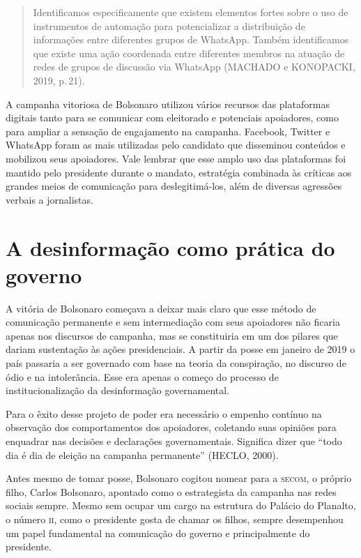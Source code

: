 \begin{quote}
Identificamos especificamente que existem elementos fortes sobre o uso
de instrumentos de automação para potencializar a distribuição de
informações entre diferentes grupos de WhatsApp. Também identificamos
que existe uma ação coordenada entre diferentes membros na atuação de
redes de grupos de discussão via WhatsApp (MACHADO e KONOPACKI, 2019, p.\,21).
\end{quote}

A campanha vitoriosa de Bolsonaro utilizou vários recursos das
plataformas digitais tanto para se comunicar com eleitorado e potenciais
apoiadores, como para ampliar a sensação de engajamento na campanha.
Facebook, Twitter e WhatsApp foram as mais utilizadas pelo candidato que
disseminou conteúdos e mobilizou seus apoiadores. Vale lembrar que esse
amplo uso das plataformas foi mantido pelo presidente durante o mandato,
estratégia combinada às críticas aos grandes meios de comunicação para
deslegitimá-los, além de diversas agressões verbais a jornalistas.

\section{A desinformação como prática do governo }

A vitória de Bolsonaro começava a deixar mais claro que esse método de
comunicação permanente e sem intermediação com seus apoiadores não
ficaria apenas nos discursos de campanha, mas se constituiria em um dos
pilares que dariam sustentação às ações presidenciais. A partir da posse
em janeiro de 2019 o país passaria a ser governado com base na teoria da
conspiração, no discurso de ódio e na intolerância. Esse era apenas o
começo do processo de institucionalização da desinformação
governamental.

Para o êxito desse projeto de poder era necessário o empenho contínuo na
observação dos comportamentos dos apoiadores, coletando suas opiniões
para enquadrar nas decisões e declarações governamentais. Significa
dizer que ``todo dia é dia de eleição na campanha permanente'' (HECLO,
2000).

Antes mesmo de tomar posse, Bolsonaro cogitou nomear para a \textsc{secom}, o próprio filho, Carlos Bolsonaro, apontado como
o estrategista da campanha nas redes sociais sempre. Mesmo sem ocupar um
cargo na estrutura do Palácio do Planalto, o número \textsc{ii}, como o presidente
gosta de chamar os filhos, sempre desempenhou um papel fundamental na
comunicação do governo e principalmente do presidente.

